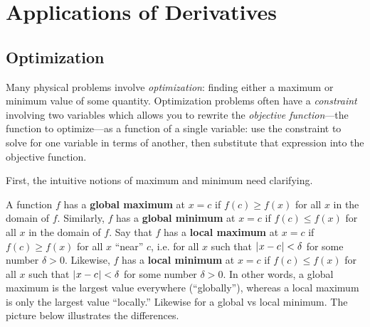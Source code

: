 \chapter{Applications of Derivatives}\label{ch:appl-of-derivs}
\section{Optimization}\label{sec:optimization}
Many physical problems involve \emph{optimization}: finding either a maximum or
minimum value of some quantity. Optimization
problems often have a \emph{constraint} involving two variables which allows you
to rewrite the \emph{objective function}---the function to optimize---as a
function of a single variable: use the constraint to solve for one variable in
terms of another, then substitute that expression into the
objective function.

First, the intuitive notions of maximum and minimum need clarifying.

 {A function $f$ has a \textbf{global maximum} at $x=c$
if $f(c) \ge f(x)$ for all $x$ in the domain of $f$. Similarly, $f$ has a
\textbf{global minimum} at $x=c$ if $f(c) \le f(x)$ for all $x$ in the domain of
$f$. Say that $f$ has a \textbf{local maximum} at $x=c$ if $f(c) \ge f(x)$ for
all $x$ ``near'' $c$, i.e. for all $x$ such that $\lvert\mspace{1mu}x-c\mspace{1mu}\rvert < \delta$ for some
number $\delta > 0$. Likewise, $f$ has a \textbf{local minimum} at $x=c$ if
$f(c) \le f(x)$ for all $x$ such that $\lvert\mspace{1mu}x-c\mspace{1mu}\rvert < \delta$ for some number
$\delta > 0$.
}
In other words, a global maximum is the largest value everywhere (``globally''),
whereas a local maximum is only the largest value ``locally.'' Likewise for a
global vs local minimum. The picture below illustrates the differences.

